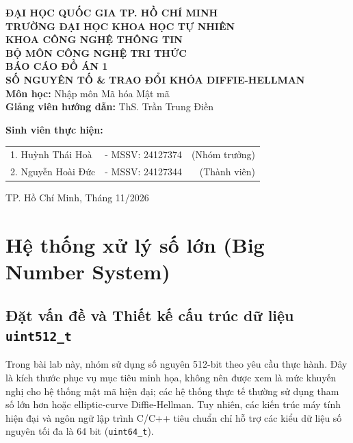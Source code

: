 \documentclass[12pt,a4paper]{article}
\theoremstyle{plain}
\begin{document}
\begin{titlepage}
    \centering
    \vspace*{0.5cm}
    {\Large \textbf{ĐẠI HỌC QUỐC GIA TP. HỒ CHÍ MINH}}\\[0.2cm]
    {\large \textbf{TRƯỜNG ĐẠI HỌC KHOA HỌC TỰ NHIÊN}}\\[0.2cm]
    {\large \textbf{KHOA CÔNG NGHỆ THÔNG TIN}}\\[0.2cm]
    {\large \textbf{BỘ MÔN CÔNG NGHỆ TRI THỨC}}\\[2.0cm]

    {\LARGE \textbf{BÁO CÁO ĐỒ ÁN 1}}\\[0.6cm]
    {\Huge \textbf{SỐ NGUYÊN TỐ \& TRAO ĐỔI KHÓA DIFFIE-HELLMAN}}\\[2.0cm]

    \textbf{Môn học:} Nhập môn Mã hóa Mật mã\\[0.3cm]
    \textbf{Giảng viên hướng dẫn:} ThS. Trần Trung Điền\\[1.5cm]

    \begin{flushleft}
    \textbf{Sinh viên thực hiện:}\\[0.3cm]
    \begin{tabular}{llr}
        1. Huỳnh Thái Hoà & - MSSV: 24127374 & (Nhóm trưởng)\\
        2. Nguyễn Hoài Đức & - MSSV: 24127344 & (Thành viên)\\
    \end{tabular}
    \end{flushleft}

    \vfill
    {\large TP. Hồ Chí Minh, Tháng 11/2026}
\end{titlepage}

\tableofcontents
\newpage


\section{Hệ thống xử lý số lớn (Big Number System)}

\subsection{Đặt vấn đề và Thiết kế cấu trúc dữ liệu \texttt{uint512\_t}}
Trong bài lab này, nhóm sử dụng số nguyên 512-bit theo yêu cầu thực hành. Đây là kích thước phục vụ mục tiêu minh họa, không nên được xem là mức khuyến nghị cho hệ thống mật mã hiện đại; các hệ thống thực tế thường sử dụng tham số lớn hơn hoặc elliptic-curve Diffie-Hellman. Tuy nhiên, các kiến trúc máy tính hiện đại và ngôn ngữ lập trình C/C++ tiêu chuẩn chỉ hỗ trợ các kiểu dữ liệu số nguyên tối đa là 64 bit (\texttt{uint64\_t}).
\end{document}

